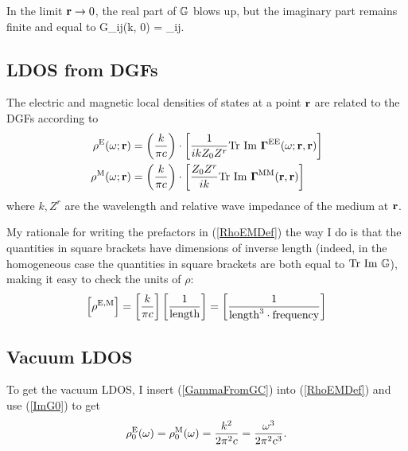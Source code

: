 \documentclass[letterpaper]{article}
\begin{document}
In the limit $\mathbf{r}\to 0$, the real part of $\mathbb{G}$ blows up,
but the imaginary part remains finite and equal to
{ \mb G_{ij}(k, 0) =
  \delta_{ij}.
}

\subsection*{LDOS from DGFs}

The electric and magnetic local densities of states at a point $\mathbf{r}$
are related to the DGFs according to
\begin{subequations}
\begin{align}
 \rho^{\text{\scriptsize E}}(\omega; \mathbf{r}) &=
\left(\frac{k}{\pi c}\right)\cdot
\left[
\frac{1}{ikZ_0 Z^r}
   \text{Tr }\text{Im }\boldsymbol{\Gamma}^{\text{\scriptsize EE}}(\omega; \mathbf{r}, \mathbf{r})
\right]
\\
 \rho^{\text{\scriptsize M}}(\omega; \mathbf{r}) &=
\left(\frac{k}{\pi c}\right)\cdot
\left[
\frac{Z_0 Z^r}{ik}
\text{Tr }\text{Im }\boldsymbol{\Gamma}^{\text{\scriptsize MM}}(\mathbf{r}, \mathbf{r})
\right]
\end{align}
\label{RhoEMDef}
\end{subequations}
where $k,Z^r$ are the wavelength and relative wave impedance
of the medium at $\mathbf{r}$.

My rationale for writing the prefactors in (\ref{RhoEMDef}) the way I do
is that the quantities in square brackets have dimensions of inverse length
(indeed, in the homogeneous case the quantities in square brackets
are both equal to $\text{Tr }\text{Im }\mathbb{G}$), making it easy to
check the units of $\rho$:
$$\Big[\rho^{\text{\scriptsize E,M}}\Big]
  =
  \left[\frac{k}{\pi c}\right]
  \left[\frac{1}{\text{length}}\right]
  =\left[\frac{1}{\text{length}^3\cdot\text{frequency}}\right]
$$

\subsection*{Vacuum LDOS}

To get the vacuum LDOS, I insert (\ref{GammaFromGC}) into (\ref{RhoEMDef})
and use (\ref{ImG0}) to get
$$ \rho_0^{\text{\scriptsize E}}(\omega)=\rho_0^{\text{\scriptsize M}}(\omega)=
   \frac{k^2}{2\pi^2 c}=\frac{\omega^3}{2\pi^2 c^3}.
$$
\end{document}
